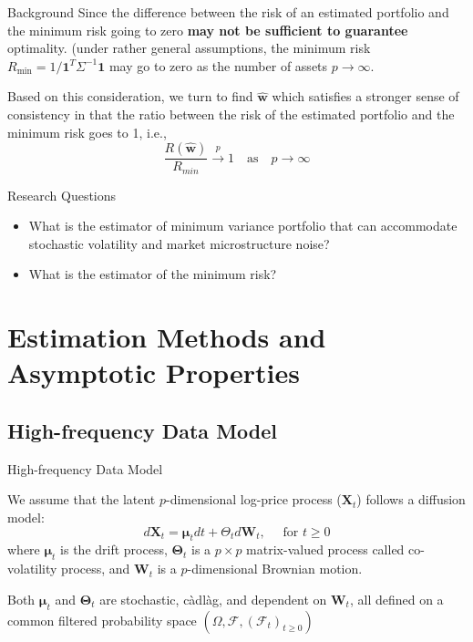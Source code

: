 \documentclass{beamer}
\begin{document}
\begin{frame}{Background}
    Since the difference between the risk of an estimated portfolio and the minimum risk going to zero \textbf{may not be sufficient to guarantee} optimality. (under rather general assumptions, the minimum risk $R_{\min} = 1/\bm{1}^T\Sigma^{-1}\bm{1}$ may go to zero as the number of assets $p\to \infty$.
    \newline
    
    Based on this consideration, we turn to find $\hat{\bm{w}}$ which satisfies a stronger sense of consistency in that the ratio between the risk of the estimated portfolio and the minimum risk goes to 1, i.e., 
    $$\frac{R(\hat{\bm{w}})}{R_{min}} \stackrel{p}{\longrightarrow} 1 \quad \text{as} \quad p\to \infty$$
\end{frame}
\begin{frame}{Research Questions}

\begin{itemize}
    \item What is the estimator of minimum variance portfolio that can accommodate stochastic volatility and market microstructure noise?
    \item What is the estimator of the minimum risk?
\end{itemize}

\end{frame}

\section{Estimation Methods and Asymptotic Properties}
\subsection{High-frequency Data Model}
\begin{frame}{High-frequency Data Model}

We assume that the latent $p$-dimensional log-price process ($\bm{X}_t$) follows a diffusion model:
\begin{equation}
\label{eqt:2-1}
    d \mathbf{X}_t=\boldsymbol{\mu}_t d t+\Theta_t d \mathbf{W}_t, \quad \text { for } t \geq 0
\end{equation}
where $\bm{\mu}_t$ is the drift process, $\bm{\Theta}_t$ is a $p\times p$ matrix-valued process called co-volatility process, and $\bm{W}_t$ is a $p$-dimensional Brownian motion.
\newline

Both $\bm{\mu}_t$ and $\bm{\Theta}_t$ are stochastic, càdlàg, and dependent on $\bm{W}_t$, all defined on a common filtered probability space $(\Omega, \mathcal{F}, (\mathcal{F}_t)_{t\geq 0})$
\end{frame}
\end{document}
